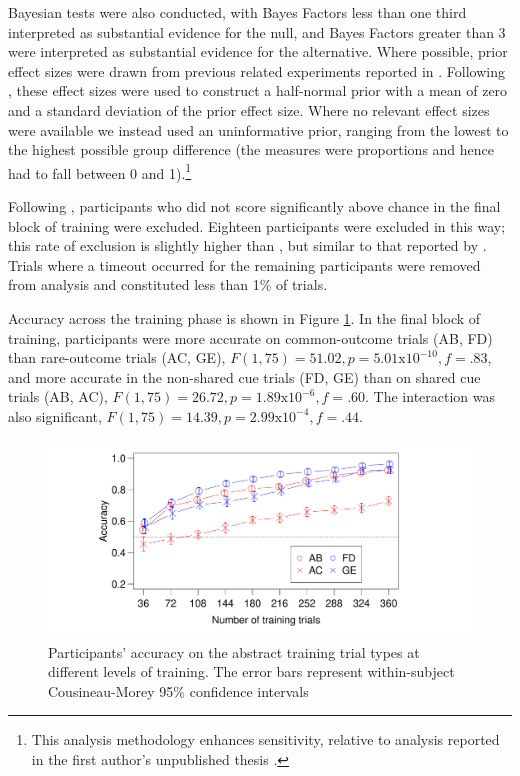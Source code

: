 \documentclass[twocolumn]{article}
\begin{document}
{Bayesian tests were also conducted, with Bayes Factors less than one third interpreted as substantial evidence for the null, and Bayes Factors greater than 3 were interpreted as substantial evidence for the alternative. Where possible, prior effect sizes were drawn from previous related experiments reported in \cite{Inkster2019}. Following \cite{Dienes2011}, these effect sizes were used to construct a half-normal prior with a mean of zero and a standard deviation of the prior effect size. Where no relevant effect sizes were available we instead used an uninformative prior, ranging from the lowest to the highest possible group difference (the measures were proportions and hence had to fall between 0 and 1).\footnote{This analysis methodology enhances sensitivity, relative to analysis reported in the first author's unpublished thesis \citep{Inkster2019}.} 

Following \cite{Wills2014}, participants who did not score significantly above chance in the final block of training were excluded. Eighteen participants were excluded in this way; this rate of exclusion is slightly higher than \cite{Wills2014}, but similar to that reported by \cite{Inkster2019}. Trials where a timeout occurred for the remaining participants were removed from analysis and constituted less than 1\% of trials.

Accuracy across the training phase is shown in Figure \ref{exp1tacc}. In the final block of training, participants were more accurate on common-outcome trials (AB, FD) than rare-outcome trials (AC, GE), $F(1,75) = 51.02, p = 5.01 \text{x} 10^{-10}, f = .83$, and more accurate in the non-shared cue trials (FD, GE) than on shared cue trials (AB, AC), $F(1,75) = 26.72, p = 1.89 \text{x} 10^{-6}, f = .60$. The interaction  was also significant, $F(1,75) = 14.39, p = 2.99 \text{x} 10^{-4}, f = .44$. 

\begin{figure}[b!]
	\centering
	\includegraphics[width = .49\textwidth,trim = 4.5cm 1cm 6cm  1cm,clip]{exp1tacc.pdf}
	\caption[Training accuracy]{Participants' accuracy on the abstract training trial types at different levels of training. The error bars represent within-subject Cousineau-Morey 95\% confidence intervals}
	\label{exp1tacc}
\end{figure}

}
\end{document}
